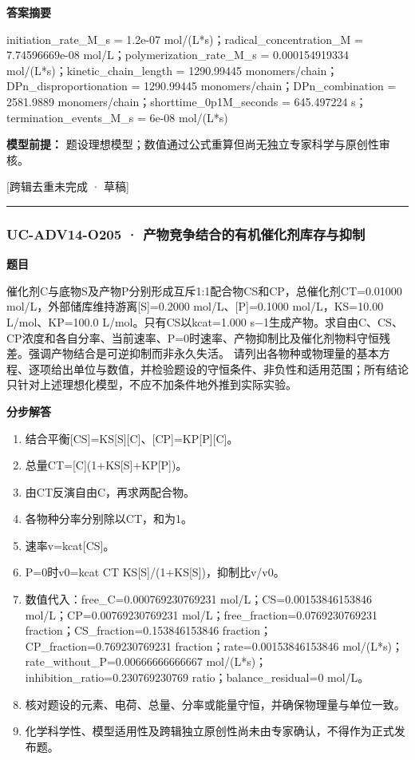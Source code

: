 \documentclass[UTF8,11pt,a4paper]{ctexart}
\begin{document}
\noindent\textbf{答案摘要}\par
initiation\_rate\_M\_s = 1.2e-07 mol/(L*s)；radical\_concentration\_M = 7.74596669e-08 mol/L；polymerization\_rate\_M\_s = 0.000154919334 mol/(L*s)；kinetic\_chain\_length = 1290.99445 monomers/chain；DPn\_disproportionation = 1290.99445 monomers/chain；DPn\_combination = 2581.9889 monomers/chain；shorttime\_0p1M\_seconds = 645.497224 s；termination\_events\_M\_s = 6e-08 mol/(L*s)\par
\noindent\textbf{模型前提：}
题设理想模型；数值通过公式重算但尚无独立专家科学与原创性审核。\par
\noindent\textcolor{red!65!black}{[跨辑去重未完成 · 草稿]} \par
\medskip\hrule\medskip
{}
\subsubsection*{UC-ADV14-O205 · 产物竞争结合的有机催化剂库存与抑制}
\noindent\textbf{题目}\par
催化剂C与底物S及产物P分别形成互斥1:1配合物CS和CP，总催化剂CT=0.01000 mol/L，外部储库维持游离[S]=0.2000 mol/L、[P]=0.1000 mol/L，KS=10.00 L/mol、KP=100.0 L/mol。只有CS以kcat=1.000 s−1生成产物。求自由C、CS、CP浓度和各自分率、当前速率、P=0时速率、产物抑制比及催化剂物料守恒残差。强调产物结合是可逆抑制而非永久失活。 请列出各物种或物理量的基本方程、逐项给出单位与数值，并检验题设的守恒条件、非负性和适用范围；所有结论只针对上述理想化模型，不应不加条件地外推到实际实验。\par
\medskip\noindent\textbf{分步解答}
\begin{enumerate}
\item 结合平衡[CS]=KS[S][C]、[CP]=KP[P][C]。
\item 总量CT=[C](1+KS[S]+KP[P])。
\item 由CT反演自由C，再求两配合物。
\item 各物种分率分别除以CT，和为1。
\item 速率v=kcat[CS]。
\item P=0时v0=kcat CT KS[S]/(1+KS[S])，抑制比v/v0。
\item 数值代入：free\_C=0.000769230769231 mol/L；CS=0.00153846153846 mol/L；CP=0.00769230769231 mol/L；free\_fraction=0.0769230769231 fraction；CS\_fraction=0.153846153846 fraction；CP\_fraction=0.769230769231 fraction；rate=0.00153846153846 mol/(L*s)；rate\_without\_P=0.00666666666667 mol/(L*s)；inhibition\_ratio=0.230769230769 ratio；balance\_residual=0 mol/L。
\item 核对题设的元素、电荷、总量、分率或能量守恒，并确保物理量与单位一致。
\item 化学科学性、模型适用性及跨辑独立原创性尚未由专家确认，不得作为正式发布题。
\end{enumerate}
\end{document}
